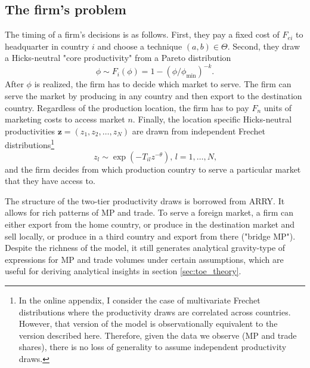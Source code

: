 \documentclass[notitlepage,11pt]{article}%
\begin{document}
\subsection{The firm's problem}

The timing of a firm's decisions is as follows. First, they pay a fixed cost
of $F_{ei}$ to headquarter in country $i$ and choose a technique $\left(
a,b\right)  \in\Theta$. Second, they draw a Hicks-neutral "core productivity"
from a Pareto distribution%
\[
\phi\sim F_{i}\left(  \phi\right)  =1-\left(  \phi/\phi_{\min}\right)  ^{-k}.
\]
After $\phi$ is realized, the firm has to decide which market to serve. The
firm can serve the market by producing in any country and then export to the
destination country. Regardless of the production location, the firm has to
pay $F_{n}$ units of marketing costs to access market $n$. Finally, the
location specific Hicks-neutral productivities $\mathbf{z}=\left(  z_{1}%
,z_{2},\dots,z_{N}\right)  $ are drawn from independent Frechet
distributions\footnote{In the online appendix, I consider the case of
multivariate Frechet distributions where the productivity draws are correlated
across countries. However, that version of the model is observationally
equivalent to the version described here. Therefore, given the data we observe
(MP and trade shares), there is no loss of generality to assume independent
productivity draws.}%
\[
z_{l}\sim\exp\left(  -T_{il}z^{-\theta}\right)  \text{, }l=1,\dots,N\text{,}%
\]
and the firm decides from which production country to serve a particular
market that they have access to.

The structure of the two-tier productivity draws is borrowed from ARRY. It
allows for rich patterns of MP and trade. To serve a foreign market, a firm
can either export from the home country, or produce in the destination market
and sell locally, or produce in a third country and export from there ("bridge
MP"). Despite the richness of the model, it still generates analytical
gravity-type of expressions for MP and trade volumes under certain
assumptions, which are useful for deriving analytical insights in section
\ref{sec:toe_theory}.
\end{document}
